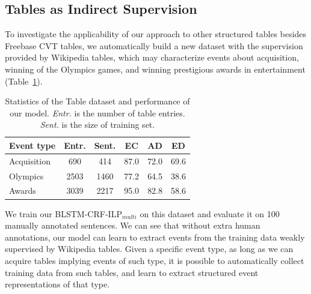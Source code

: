 \subsection{Tables as Indirect Supervision}
To investigate the applicability of our approach to other structured tables besides Freebase CVT tables, %
we automatically build a new dataset with the supervision provided by Wikipedia tables, which may characterize events about acquisition, winning of the Olympics games, and winning prestigious awards in entertainment (Table~\ref{tab:6}). 


\begin{table}[h]
\small
\centering
\begin{tabular}{|l|c|c|c|c|c|} \hline
	Event type & Entr. & Sent. & EC & AD & ED \\ \hline
	Acquisition & 690 & 414 & 87.0 & 72.0 & 69.6 \\ \hline
	Olympics & 2503 & 1460 & 77.2 & 64.5 & 38.6 \\ \hline
	Awards & 3039 & 2217 & 95.0 & 82.8 & 58.6 \\ \hline
\end{tabular}
\caption{Statistics of the Table dataset and performance of our model. \textit{Entr.} is the number of table entries. \textit{Sent.} is the size of training set.\label{tab:6}}
\end{table}

We train our BLSTM-CRF-ILP$_{multi}$ on this dataset and evaluate it on 100 manually annotated sentences.
We can see that without extra human annotations, %
our model can learn to extract events from the training data weakly supervised by Wikipedia tables. Given a specific event type, as long as we can acquire tables implying events of such type, it is possible to automatically collect training data from such tables, and learn to extract structured event representations of that type. %
